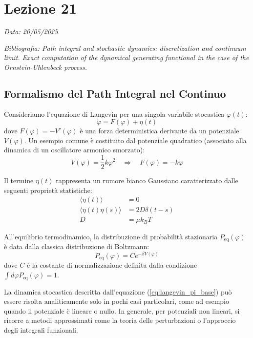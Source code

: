 \chapter{Lezione 21}
\label{chap:lezione_21} %

\begin{flushright}
\textit{Data: 20/05/2025}
\end{flushright}
\textit{Bibliografia: 
Path integral and stochastic dynamics: discretization and continuum limit. Exact computation of the dynamical generating functional in the case of the Ornstein-Uhlenbeck process.}

\section{Formalismo del Path Integral nel Continuo}
Consideriamo l'equazione di Langevin per una singola variabile stocastica $\varphi(t)$:
\begin{equation}
\dot{\varphi} = F(\varphi) + \eta(t)
\label{eq:langevin_pi_base}
\end{equation}
dove $F(\varphi) = -V'(\varphi)$ è una forza deterministica derivante da un potenziale $V(\varphi)$. Un esempio comune è costituito dal potenziale quadratico (associato alla dinamica di un oscillatore armonico smorzato):
\begin{equation}
V(\varphi) = \frac{1}{2}k\varphi^2 \quad \Rightarrow \quad F(\varphi) = -k\varphi
\end{equation}

Il termine $\eta(t)$ rappresenta un rumore bianco Gaussiano caratterizzato dalle seguenti proprietà statistiche:
\begin{align}
\langle \eta(t) \rangle &= 0 \\
\langle \eta(t)\eta(s) \rangle &= 2D\delta(t-s) \\
D &= \mu k_B T
\end{align}

All'equilibrio termodinamico, la distribuzione di probabilità stazionaria $P_{\text{eq}}(\varphi)$ è data dalla classica distribuzione di Boltzmann:
\begin{equation}
P_{\text{eq}}(\varphi) = C e^{-\beta V(\varphi)}
\label{eq:boltzmann_pi_det}
\end{equation}
dove $C$ è la costante di normalizzazione definita dalla condizione $\int d\varphi P_{\text{eq}}(\varphi) = 1$.

La dinamica stocastica descritta dall'equazione (\ref{eq:langevin_pi_base}) può essere risolta analiticamente solo in pochi casi particolari, come ad esempio quando il potenziale è lineare o nullo. In generale, per potenziali non lineari, si ricorre a metodi approssimati come la teoria delle perturbazioni o l'approccio degli integrali funzionali.

